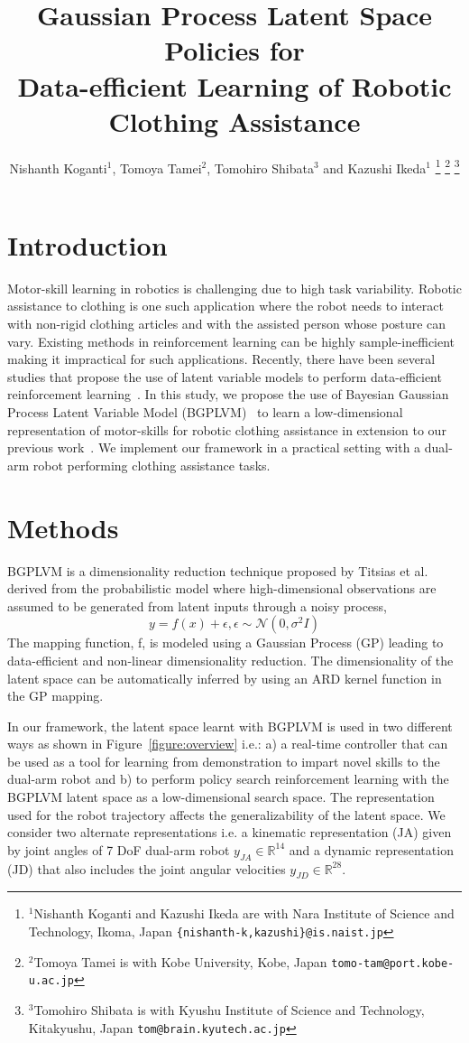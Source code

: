 \documentclass[letterpaper, 10 pt, conference]{ieeeconf}
\title{\LARGE \bf Gaussian Process Latent Space Policies for \\ Data-efficient Learning of Robotic Clothing Assistance}
\author{Nishanth Koganti$^{1}$, Tomoya Tamei$^{2}$, Tomohiro Shibata$^{3}$ and Kazushi Ikeda$^{1}$%
\thanks{$^{1}$Nishanth Koganti and Kazushi Ikeda are with Nara Institute of Science and Technology, Ikoma, Japan
        {\tt\small \{nishanth-k,kazushi\}@is.naist.jp}}%
\thanks{$^{2}$Tomoya Tamei is with Kobe University, Kobe, Japan
        {\tt\small tomo-tam@port.kobe-u.ac.jp}}%
\thanks{$^{3}$Tomohiro Shibata is with Kyushu Institute of Science and Technology, Kitakyushu, Japan
        {\tt\small tom@brain.kyutech.ac.jp}}%
}
\begin{document}
\maketitle
\thispagestyle{empty}
\pagestyle{empty}

\section{Introduction}
Motor-skill learning in robotics is challenging due to high task variability. Robotic assistance to clothing is one such application where the robot needs to interact with non-rigid clothing articles and with the assisted person whose posture can vary. Existing methods in reinforcement learning can be highly sample-inefficient making it impractical for such applications. Recently, there have been several studies that propose the use of latent variable models to perform data-efficient reinforcement learning~\cite{lrl1, lrl2}. In this study, we propose the use of Bayesian Gaussian Process Latent Variable Model (BGPLVM)~\cite{bgplvm} to learn a low-dimensional representation of motor-skills for robotic clothing assistance in extension to our previous work~\cite{koganti2016}. We implement our framework in a practical setting with a dual-arm robot performing clothing assistance tasks.

\section{Methods}
BGPLVM is a dimensionality reduction technique proposed by Titsias et al.~\cite{bgplvm} derived from the probabilistic model where high-dimensional observations are assumed to be generated from latent inputs through a noisy process,
\begin{equation}
	y = f(x) + \epsilon, \epsilon \sim \mathcal{N}(0,\sigma^2I)
\end{equation}
The mapping function, f, is modeled using a Gaussian Process (GP) leading to data-efficient and non-linear dimensionality reduction. The dimensionality of the latent space can be automatically inferred by using an ARD kernel function in the GP mapping.

In our framework, the latent space learnt with BGPLVM is used in two different ways as shown in Figure~\ref{figure:overview} i.e.: a) a real-time controller that can be used as a tool for learning from demonstration to impart novel skills to the dual-arm robot and b) to perform policy search reinforcement learning with the BGPLVM latent space as a low-dimensional search space. The representation used for the robot trajectory affects the generalizability of the latent space. We consider two alternate representations i.e. a kinematic representation (JA) given by joint angles of 7 DoF dual-arm robot $y_{JA} \in \mathbb{R}^{14}$ and a dynamic representation (JD) that also includes the joint angular velocities $y_{JD} \in \mathbb{R}^{28}$.
\end{document}
